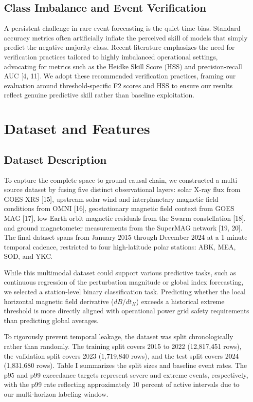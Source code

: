 \documentclass[conference]{IEEEtran}
\begin{document}
\subsection{Class Imbalance and Event Verification}
A persistent challenge in rare-event forecasting is the quiet-time bias. Standard accuracy metrics often artificially inflate the perceived skill of models that simply predict the negative majority class. Recent literature emphasizes the need for verification practices tailored to highly imbalanced operational settings, advocating for metrics such as the Heidke Skill Score (HSS) and precision-recall AUC [4, 11]. We adopt these recommended verification practices, framing our evaluation around threshold-specific F2 scores and HSS to ensure our results reflect genuine predictive skill rather than baseline exploitation.

\section{Dataset and Features}

\subsection{Dataset Description}
To capture the complete space-to-ground causal chain, we constructed a multi-source dataset by fusing five distinct observational layers: solar X-ray flux from GOES XRS [15], upstream solar wind and interplanetary magnetic field conditions from OMNI [16], geostationary magnetic field context from GOES MAG [17], low-Earth orbit magnetic residuals from the Swarm constellation [18], and ground magnetometer measurements from the SuperMAG network [19, 20]. The final dataset spans from January 2015 through December 2024 at a 1-minute temporal cadence, restricted to four high-latitude polar stations: ABK, MEA, SOD, and YKC.

While this multimodal dataset could support various predictive tasks, such as continuous regression of the perturbation magnitude or global index forecasting, we selected a station-level binary classification task. Predicting whether the local horizontal magnetic field derivative ($dB/dt_H$) exceeds a historical extreme threshold is more directly aligned with operational power grid safety requirements than predicting global averages.

To rigorously prevent temporal leakage, the dataset was split chronologically rather than randomly. The training split covers 2015 to 2022 (12,817,451 rows), the validation split covers 2023 (1,719,840 rows), and the test split covers 2024 (1,831,680 rows). Table I summarizes the split sizes and baseline event rates. The p95 and p99 exceedance targets represent severe and extreme events, respectively, with the p99 rate reflecting approximately 10 percent of active intervals due to our multi-horizon labeling window.
\end{document}
